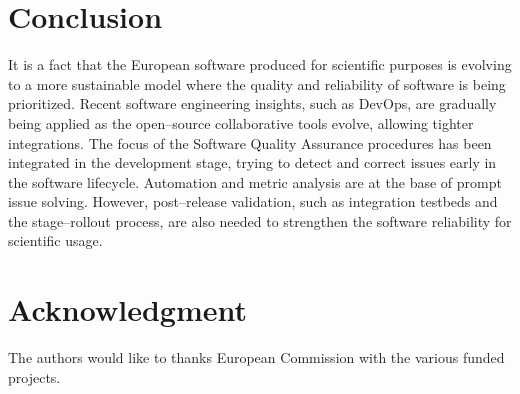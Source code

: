 \documentclass[journal]{IEEEtran}
\begin{document}
\section{Conclusion}

It is a fact that the European software produced for scientific purposes is evolving to a more sustainable model where the quality and reliability of software is being prioritized. Recent software engineering insights, such as DevOps, are gradually being applied as the open--source collaborative tools evolve, allowing tighter integrations. The focus of the Software Quality Assurance procedures has been integrated in the development stage, trying to detect and correct issues early in the software lifecycle. Automation and metric analysis are at the base of prompt issue solving. However, post--release validation, such as integration testbeds and the stage--rollout process, are also needed to strengthen the software reliability for scientific usage.


\section*{Acknowledgment}
The authors would like to thanks European Commission with the various funded projects.


\end{document}
